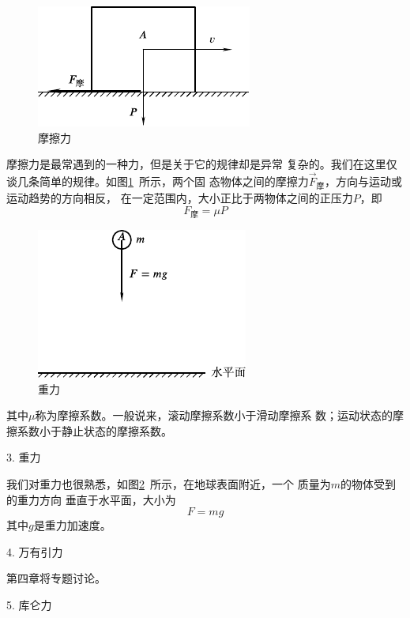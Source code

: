 \begin{figure}
  \includegraphics{figure/fig03.04}
  \caption{摩擦力}
  \label{fig:03.04}
\end{figure}
摩擦力是最常遇到的一种力，但是关于它的规律却是异常
复杂的。我们在这里仅谈几条简单的规律。如图\ref{fig:03.04}~所示，两个固
态物体之间的摩擦力$ \vec{F}_\text{摩} $，方向与运动或运动趋势的方向相反，
在一定范围内，大小正比于两物体之间的正压力$ P $，即\vspace{-0.2em}
\begin{equation}\label{eqn:03.04.02}
  F_\text{摩} = \mu P
\end{equation}

\begin{figure}
  \includegraphics{figure/fig03.05}
  \caption{重力}
  \label{fig:03.05}
\end{figure}
\noindent 其中$\mu$称为摩擦系数。一般说来，滚动摩擦系数小于滑动摩擦系
数；运动状态的摩擦系数小于静止状态的摩擦系数。

\textsf{3. 重力}

我们对重力也很熟悉，如图\ref{fig:03.05}~所示，在地球表面附近，一个
质量为$ m $的物体受到的重力方向
垂直于水平面，大小为
\begin{equation}\label{eqn:03.04.03}
  F = m g
\end{equation}
其中$ g $是重力加速度。

\textsf{4. 万有引力}

第四章将专题讨论。

\textsf{5. 库仑力}

